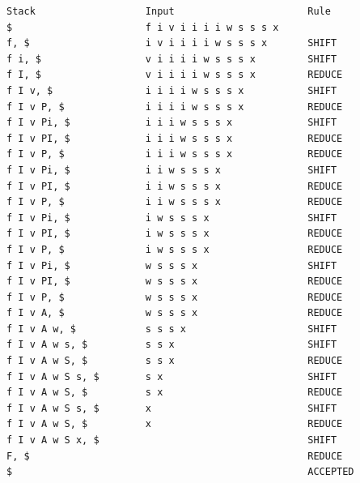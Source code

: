 \begin{lstlisting}
Stack                   Input                       Rule
$                       f i v i i i i w s s s x
f, $                    i v i i i i w s s s x       SHIFT
f i, $                  v i i i i w s s s x         SHIFT
f I, $                  v i i i i w s s s x         REDUCE
f I v, $                i i i i w s s s x           SHIFT
f I v P, $              i i i i w s s s x           REDUCE
f I v Pi, $             i i i w s s s x             SHIFT
f I v PI, $             i i i w s s s x             REDUCE
f I v P, $              i i i w s s s x             REDUCE
f I v Pi, $             i i w s s s x               SHIFT
f I v PI, $             i i w s s s x               REDUCE
f I v P, $              i i w s s s x               REDUCE
f I v Pi, $             i w s s s x                 SHIFT
f I v PI, $             i w s s s x                 REDUCE
f I v P, $              i w s s s x                 REDUCE
f I v Pi, $             w s s s x                   SHIFT
f I v PI, $             w s s s x                   REDUCE
f I v P, $              w s s s x                   REDUCE
f I v A, $              w s s s x                   REDUCE
f I v A w, $            s s s x                     SHIFT
f I v A w s, $          s s x                       SHIFT
f I v A w S, $          s s x                       REDUCE
f I v A w S s, $        s x                         SHIFT   
f I v A w S, $          s x                         REDUCE
f I v A w S s, $        x                           SHIFT   
f I v A w S, $          x                           REDUCE
f I v A w S x, $                                    SHIFT   
F, $                                                REDUCE
$                                                   ACCEPTED
\end{lstlisting}



